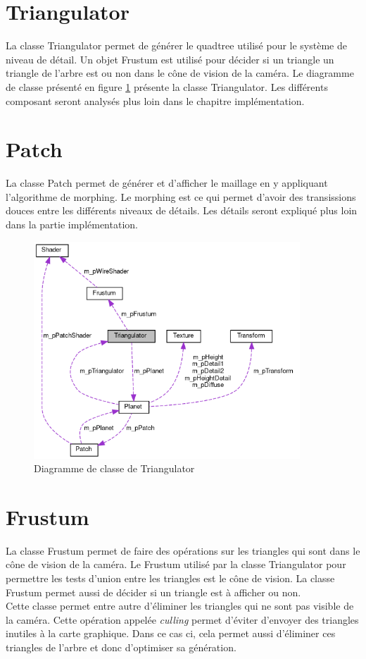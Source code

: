   \section{Triangulator}
  La classe Triangulator permet de générer le quadtree utilisé pour le système de niveau de détail.
  Un objet Frustum est utilisé pour décider si un triangle un triangle de l'arbre est ou non dans le cône 
  de vision de la caméra. Le diagramme de classe présenté en figure \ref{fig:plan} présente la classe
  Triangulator. Les différents composant seront analysés plus loin dans le chapitre implémentation.
  
  \section{Patch}
  La classe Patch permet de générer et d'afficher le maillage en y appliquant l'algorithme de morphing.
  Le morphing est ce qui permet d'avoir des transissions douces entre les différents niveaux de détails.
  Les détails seront expliqué plus loin dans la partie implémentation.
  
  
  \begin{figure}
  \centering
  \includegraphics[width=10cm]{img/triangulator.png}
  \caption{Diagramme de classe de Triangulator}
  \label{fig:plan}
  \end{figure}
  
  \section{Frustum}
  La classe Frustum permet de faire des opérations sur les triangles qui sont dans le cône de vision de la caméra. Le Frustum utilisé par la classe Triangulator pour permettre les tests d'union entre les triangles est le cône de vision. La classe Frustum permet aussi de décider si un triangle est à afficher ou non.\\
  
  Cette classe permet entre autre d'éliminer les triangles qui ne sont pas visible de la caméra. Cette opération appelée \textit{culling} permet d'éviter d'envoyer des triangles inutiles à la carte graphique.
  Dans ce cas ci, cela permet aussi d'éliminer ces triangles de l'arbre et donc d'optimiser sa génération.
  
 \newpage %
 